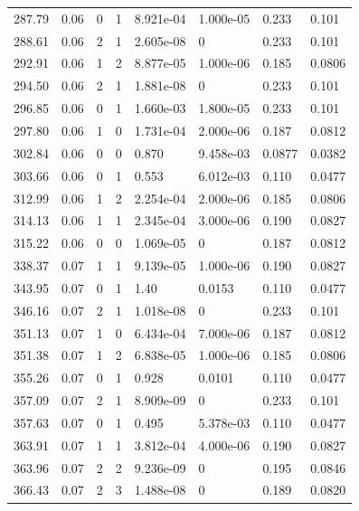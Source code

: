 \documentclass[preview]{standalone}
\begin{document}
{{{\begin{tabular}{L{1.2cm}C{1.2cm} C{0.3cm}C{0.5cm} C{1.4cm}C{1.4cm} C{1.4cm}C{1.4cm}}
  287.79  &  0.06  & 0     &  1 &  8.921e-04  & 1.000e-05  & 0.233 &  0.101   \\ 
  288.61  &  0.06  & 2     &  1 &  2.605e-08  & 0  & 0.233 &  0.101   \\ 
  292.91  &  0.06  & 1     &  2 &  8.877e-05  & 1.000e-06  & 0.185 &  0.0806   \\ 
  294.50  &  0.06  & 2     &  1 &  1.881e-08  & 0  & 0.233 &  0.101   \\ 
  296.85  &  0.06  & 0     &  1 &  1.660e-03  & 1.800e-05  & 0.233 &  0.101   \\ 
  297.80  &  0.06  & 1     &  0 &  1.731e-04  & 2.000e-06  & 0.187 &  0.0812   \\ 
  302.84  &  0.06  & 0     &  0 &  0.870  & 9.458e-03  & 0.0877 &  0.0382   \\ 
  303.66  &  0.06  & 0     &  1 &  0.553  & 6.012e-03  & 0.110 &  0.0477   \\ 
  312.99  &  0.06  & 1     &  2 &  2.254e-04  & 2.000e-06  & 0.185 &  0.0806   \\ 
  314.13  &  0.06  & 1     &  1 &  2.345e-04  & 3.000e-06  & 0.190 &  0.0827   \\ 
  315.22  &  0.06  & 0     &  0 &  1.069e-05  & 0  & 0.187 &  0.0812   \\ 
  338.37  &  0.07  & 1     &  1 &  9.139e-05  & 1.000e-06  & 0.190 &  0.0827   \\ 
  343.95  &  0.07  & 0     &  1 &  1.40  & 0.0153  & 0.110 &  0.0477   \\ 
  346.16  &  0.07  & 2     &  1 &  1.018e-08  & 0  & 0.233 &  0.101   \\ 
  351.13  &  0.07  & 1     &  0 &  6.434e-04  & 7.000e-06  & 0.187 &  0.0812   \\ 
  351.38  &  0.07  & 1     &  2 &  6.838e-05  & 1.000e-06  & 0.185 &  0.0806   \\ 
  355.26  &  0.07  & 0     &  1 &  0.928  & 0.0101  & 0.110 &  0.0477   \\ 
  357.09  &  0.07  & 2     &  1 &  8.909e-09  & 0  & 0.233 &  0.101   \\ 
  357.63  &  0.07  & 0     &  1 &  0.495  & 5.378e-03  & 0.110 &  0.0477   \\ 
  363.91  &  0.07  & 1     &  1 &  3.812e-04  & 4.000e-06  & 0.190 &  0.0827   \\ 
  363.96  &  0.07  & 2     &  2 &  9.236e-09  & 0  & 0.195 &  0.0846   \\ 
  366.43  &  0.07  & 2     &  3 &  1.488e-08  & 0  & 0.189 &  0.0820   \\ 

\end{tabular}}}}
\end{document}
